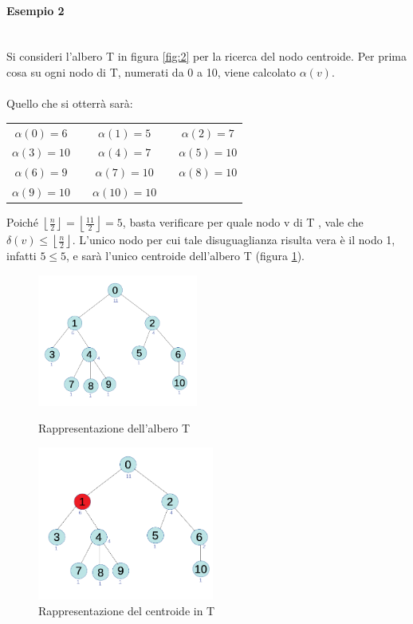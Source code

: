 \paragraph{Esempio 2}\mbox{}\\
Si consideri l’albero T in figura \ref{fig:2} per la ricerca del nodo centroide.
Per prima cosa su ogni nodo di T, numerati da 0 a 10, viene calcolato $\alpha(v)$. \\\\
Quello che si otterr\`a sar\`a:



\begin{center}
	\begin{tabular}{ c c c c c  }
		$\alpha(0) = 6$ & & $\alpha(1) = 5$ & & $\alpha(2) = 7$ \\ 
		$\alpha(3) = 10$ && $\alpha(4) = 7$ &&  $\alpha(5) =  10$ \\  
		$\alpha(6) = 9$ && $\alpha(7) = 10$ && $\alpha(8) = 10$ \\
		 $\alpha(9) = 10$ && $\alpha(10) = 10$ &&
	\end{tabular}
\end{center}
Poich\'e $ \left\lfloor\frac{n}{2} \right\rfloor = \left\lfloor \frac{11}{2} \right\rfloor = 5$, basta verificare per quale nodo v di T , vale che $\delta(v) \le \left\lfloor\frac{n}{2} \right\rfloor$.
L’unico nodo per cui tale disuguaglianza risulta vera \`e il nodo 1, infatti $5\le 5$, e sar\`a l’unico centroide dell’albero T (figura \ref{fig:3}).
	\begin{figure}[!htb]
	\begin{minipage}{0.48\textwidth}
	\centering
	\includegraphics[width=5.26cm]{capitolo3/grafo1c}
	\caption{Rappresentazione dell'albero T}
	\label{fig:2}
	\end{minipage}\hfill
	\begin{minipage}{0.48\textwidth}
			\centering
		\includegraphics[width=5.8cm]{capitolo3/grafo2}
		\caption{Rappresentazione del centroide in T}
		\label{fig:3}
	\end{minipage}
\end{figure}\\
